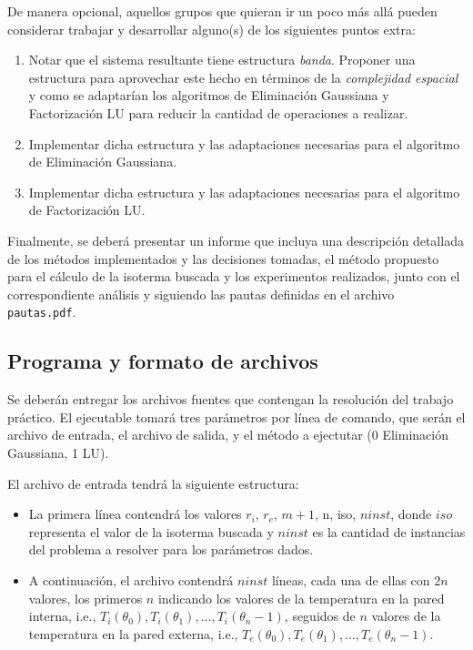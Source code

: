 \documentclass[11pt, a4paper, spanish]{article}
\theoremstyle{plain}
\theoremstyle{remark}
\begin{document}
\begin{appendices}
      De manera opcional, aquellos grupos que quieran ir un poco más allá pueden considerar trabajar y desarrollar alguno(s) de los siguientes puntos extra:
      \begin{enumerate}
        \item Notar que el sistema resultante tiene estructura \emph{banda}. Proponer una estructura para aprovechar este hecho en términos de la \emph{complejidad espacial} y como se adaptarían los algoritmos de Eliminación Gaussiana y Factorización LU para reducir la cantidad de operaciones a realizar.
        \item Implementar dicha estructura y las adaptaciones necesarias para el algoritmo de Eliminación Gaussiana.
        \item Implementar dicha estructura y las adaptaciones necesarias para el algoritmo de Factorización LU.
      \end{enumerate}

      Finalmente, se deberá presentar un informe que incluya una descripción detallada de los métodos implementados y las decisiones tomadas, el método propuesto para el cálculo de la isoterma buscada y los experimentos realizados, junto con el correspondiente análisis y siguiendo las pautas definidas en el archivo \texttt{pautas.pdf}.

    \subsection{Programa y formato de archivos}
      Se deberán entregar los archivos fuentes que contengan la resolución del trabajo práctico. El ejecutable tomará tres parámetros por línea de comando, que serán el archivo de entrada, el archivo de salida, y el método a ejectutar (0 Eliminación Gaussiana, 1 LU).

      El archivo de entrada tendrá la siguiente estructura:
      \begin{itemize}
        \item La primera línea contendrá los valores $r_i$, $r_e$, $m + 1$, n, iso, $ninst$, donde $iso$ representa el valor de la isoterma buscada y $ninst$ es la cantidad de instancias del problema a resolver para los parámetros dados.
        \item A continuación, el archivo contendrá $ninst$ líneas, cada una de ellas con $2 n$ valores, los primeros $n$ indicando los valores de la temperatura en la pared interna, i.e., $T_i(\theta_0), T_i(\theta_1), \dots, T_i(\theta_n-1)$, seguidos de $n$ valores de la temperatura en la pared externa, i.e., $T_e(\theta_0), T_e(\theta_1), \dots, T_e(\theta_n-1)$.
      \end{itemize}


\end{appendices}
\end{document}

